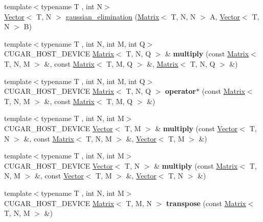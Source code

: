 \begin{DoxyCompactItemize}
\item 
{\footnotesize template$<$typename T , int N$>$ }\\\hyperlink{structcugar_1_1_vector}{Vector}$<$ T, N $>$ \hyperlink{group___matrices_module_ga00891ffdf015baf5d6f88d07319fe75f}{gaussian\+\_\+elimination} (\hyperlink{structcugar_1_1_matrix}{Matrix}$<$ T, N, N $>$ A, \hyperlink{structcugar_1_1_vector}{Vector}$<$ T, N $>$ B)
\item 
{\footnotesize template$<$typename T , int N, int M, int Q$>$ }\\C\+U\+G\+A\+R\+\_\+\+H\+O\+S\+T\+\_\+\+D\+E\+V\+I\+CE \hyperlink{structcugar_1_1_matrix}{Matrix}$<$ T, N, Q $>$ \& {\bfseries multiply} (const \hyperlink{structcugar_1_1_matrix}{Matrix}$<$ T, N, M $>$ \&, const \hyperlink{structcugar_1_1_matrix}{Matrix}$<$ T, M, Q $>$ \&, \hyperlink{structcugar_1_1_matrix}{Matrix}$<$ T, N, Q $>$ \&)
\item 
{\footnotesize template$<$typename T , int N, int M, int Q$>$ }\\C\+U\+G\+A\+R\+\_\+\+H\+O\+S\+T\+\_\+\+D\+E\+V\+I\+CE \hyperlink{structcugar_1_1_matrix}{Matrix}$<$ T, N, Q $>$ {\bfseries operator$\ast$} (const \hyperlink{structcugar_1_1_matrix}{Matrix}$<$ T, N, M $>$ \&, const \hyperlink{structcugar_1_1_matrix}{Matrix}$<$ T, M, Q $>$ \&)
\item 
{\footnotesize template$<$typename T , int N, int M$>$ }\\C\+U\+G\+A\+R\+\_\+\+H\+O\+S\+T\+\_\+\+D\+E\+V\+I\+CE \hyperlink{structcugar_1_1_vector}{Vector}$<$ T, M $>$ \& {\bfseries multiply} (const \hyperlink{structcugar_1_1_vector}{Vector}$<$ T, N $>$ \&, const \hyperlink{structcugar_1_1_matrix}{Matrix}$<$ T, N, M $>$ \&, \hyperlink{structcugar_1_1_vector}{Vector}$<$ T, M $>$ \&)
\item 
{\footnotesize template$<$typename T , int N, int M$>$ }\\C\+U\+G\+A\+R\+\_\+\+H\+O\+S\+T\+\_\+\+D\+E\+V\+I\+CE \hyperlink{structcugar_1_1_vector}{Vector}$<$ T, N $>$ \& {\bfseries multiply} (const \hyperlink{structcugar_1_1_matrix}{Matrix}$<$ T, N, M $>$ \&, const \hyperlink{structcugar_1_1_vector}{Vector}$<$ T, M $>$ \&, \hyperlink{structcugar_1_1_vector}{Vector}$<$ T, N $>$ \&)
\item 
{\footnotesize template$<$typename T , int N, int M$>$ }\\C\+U\+G\+A\+R\+\_\+\+H\+O\+S\+T\+\_\+\+D\+E\+V\+I\+CE \hyperlink{structcugar_1_1_matrix}{Matrix}$<$ T, M, N $>$ {\bfseries transpose} (const \hyperlink{structcugar_1_1_matrix}{Matrix}$<$ T, N, M $>$ \&)

\end{DoxyCompactItemize}
